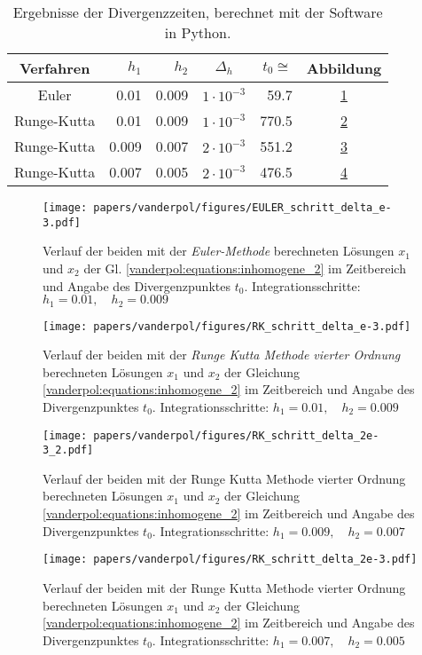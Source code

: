\begin{table}[]
\centering
\begin{tabular}{|c|r|r|c|r|c|}
\hline
Verfahren	& $h_1$ & $h_2$ 	& $\Delta_h$ & $t_0\cong$ 	& Abbildung \\ \hline
Euler		& 0.01	& 0.009 & $1 \cdot 10^{-3}$ & 59.7  	& \ref{vanderpol:figures:EULER_schritt} 		\\ 
Runge-Kutta & 0.01  & 0.009	& $1 \cdot 10^{-3}$ & 770.5 & \ref{vanderpol:figures:RK_schritt_e-3} 	\\
Runge-Kutta & 0.009 & 0.007	& $2 \cdot 10^{-3}$ & 551.2 & \ref{vanderpol:figures:RK_schritt_2e-3} 	\\ 
Runge-Kutta & 0.007 & 0.005	& $2 \cdot 10^{-3}$ & 476.5 & \ref{vanderpol:figures:RK_schritt_2e-3_2} \\ \hline
\end{tabular}
\caption{Ergebnisse der Divergenzzeiten, berechnet mit der Software in Python.}
\label{vanderpol:tab:tab1}
\end{table}

\begin{figure}
\texttt{[image: papers/vanderpol/figures/EULER\_schritt\_delta\_e-3.pdf]}
\caption{Verlauf der beiden mit der {\em Euler-Methode} berechneten Lösungen $x_1$ und $x_2$ der Gl. \eqref{vanderpol:equations:inhomogene_2} im Zeitbereich und Angabe des Divergenzpunktes $t_0$. Integrationsschritte: $h_1 = 0.01, \quad h_2 = 0.009$\label{vanderpol:figures:EULER_schritt}}
\end{figure}

\begin{figure}
\texttt{[image: papers/vanderpol/figures/RK\_schritt\_delta\_e-3.pdf]}
\caption{Verlauf der beiden mit der {\em Runge Kutta Methode vierter Ordnung} berechneten Lösungen $x_1$ und $x_2$ der Gleichung \eqref{vanderpol:equations:inhomogene_2} im Zeitbereich und Angabe des Divergenzpunktes $t_0$. Integrationsschritte: $h_1 = 0.01, \quad h_2 = 0.009$\label{vanderpol:figures:RK_schritt_e-3}}
\end{figure}

\begin{figure}
\texttt{[image: papers/vanderpol/figures/RK\_schritt\_delta\_2e-3\_2.pdf]}
\caption{Verlauf der beiden mit der Runge Kutta Methode vierter Ordnung berechneten Lösungen $x_1$ und $x_2$ der Gleichung \eqref{vanderpol:equations:inhomogene_2} im Zeitbereich und Angabe des Divergenzpunktes $t_0$. Integrationsschritte: $h_1 = 0.009, \quad h_2 = 0.007$\label{vanderpol:figures:RK_schritt_2e-3}}
\end{figure}

\begin{figure}
\texttt{[image: papers/vanderpol/figures/RK\_schritt\_delta\_2e-3.pdf]}
\caption{Verlauf der beiden mit der Runge Kutta Methode vierter Ordnung berechneten Lösungen $x_1$ und $x_2$ der Gleichung \eqref{vanderpol:equations:inhomogene_2} im Zeitbereich und Angabe des Divergenzpunktes $t_0$. Integrationsschritte: $h_1 = 0.007, \quad h_2 = 0.005$\label{vanderpol:figures:RK_schritt_2e-3_2}}
\end{figure}

